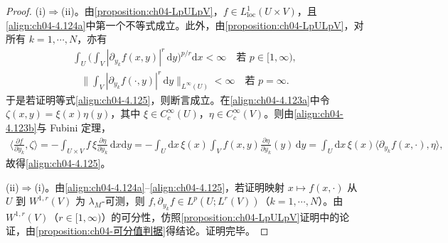 \documentclass[../../main.tex]{subfiles}%
\begin{document}
\begin{proof}
(i)$\Rightarrow$(ii)。由\cref{proposition:ch04-LpULpV}，$f\in L^1_{\mathrm{loc}}(U\times V)$，且\eqref{align:ch04-4.124a}中第一个不等式成立。此外，由\cref{proposition:ch04-LpULpV}，对所有 $k=1,\cdots ,N$，亦有
\begin{align*}
\int_U\Big(\int_V|\partial_{y_k}f(x,y)|^r\,\mathrm{d}y\Big)^{p/r}\mathrm{d}x<\infty\quad\text{若 }p\in[1,\infty),
\end{align*}
\begin{align*}
\Big\|\int_V|\partial_{y_k}f(\cdot,y)|^r\,\mathrm{d}y\Big\|_{L^\infty(U)}<\infty\quad\text{若 }p=\infty.
\end{align*}
于是若证明等式\eqref{align:ch04-4.125}，则断言成立。在\eqref{align:ch04-4.123a}中令 $\zeta(x,y)=\xi(x)\eta(y)$，其中 $\xi\in C_c^\infty(U)$，$\eta\in C_c^\infty(V)$。则由\eqref{align:ch04-4.123b}与 Fubini 定理，
\begin{align*}
\Big\langle\frac{\partial f}{\partial y_k},\zeta\Big\rangle
=-\int_{U\times V}f\,\xi\frac{\partial\eta}{\partial y_k}\,\mathrm{d}x\mathrm{d}y
=-\int_U\mathrm{d}x\,\xi(x)\int_V f(x,y)\frac{\partial\eta}{\partial y_k}(y)\,\mathrm{d}y
=\int_U\mathrm{d}x\,\xi(x)\langle\partial_{y_k}f(x,\cdot),\eta\rangle,
\end{align*}
故得\eqref{align:ch04-4.125}。

(ii)$\Rightarrow$(i)。由\eqref{align:ch04-4.124a}--\eqref{align:ch04-4.125}，若证明映射 $x\mapsto f(x,\cdot)$ 从 $U$ 到 $W^{1,r}(V)$ 为 $\lambda_M$-可测，则 $f,\partial_{y_k}f\in L^p(U;L^r(V))$（$k=1,\cdots ,N$）。由 $W^{1,r}(V)$（$r\in[1,\infty)$）的可分性，仿照\cref{proposition:ch04-LpULpV}证明中的论证，由\cref{proposition:ch04-可分值判据}得结论。证明完毕。
\end{proof}
\end{document}
